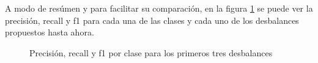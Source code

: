 A modo de resúmen y para facilitar su comparación, en la figura \ref{fig:comparaciones} se puede ver la precisión, recall y f1 para cada una de las clases y cada uno de los desbalances propuestos hasta ahora.
\begin{figure}
    \centering
    
    
    \caption{Precisión, recall y f1 por clase para los primeros tres desbalances}
    \label{fig:comparaciones}
\end{figure}

